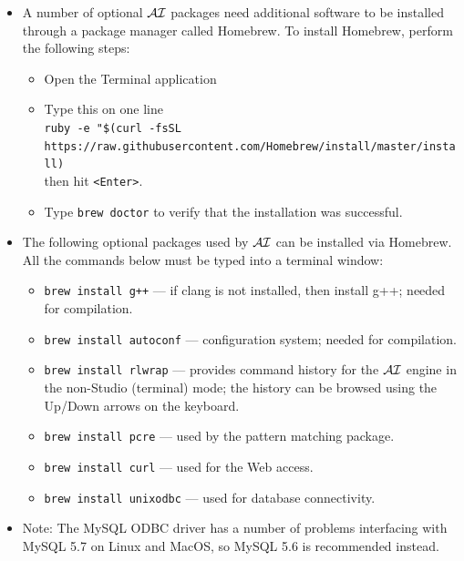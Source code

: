 \documentclass[11pt]{article}
\newcommand{\ERGO}{\mbox{\smaller{\ensuremath{\cal{E}}\smaller{{\sc{RGO}}}}}\xspace}
\newcommand{\ERGOAI}{\mbox{\smaller{\ensuremath{\cal{E}}\smaller{{\sc{RGO}}}}\ensuremath{\cal{AI}}}\xspace}
\begin{document}
\begin{itemize}
\begin{itemize}
\begin{itemize}
\begin{itemize}
      \end{itemize}
    \item A number of optional \ERGOAI packages need additional software to be
      installed through a package manager called Homebrew. To install
      Homebrew, perform the following steps:
      \begin{itemize}
      \item Open the Terminal application
      \item Type this on one line
        \\
        \texttt{ruby -e "\$(curl -fsSL\\
          \hspace*{2mm}
          https://raw.githubusercontent.com/Homebrew/install/master/install)}
        \\
        then hit \texttt{<Enter>}.
      \item Type \texttt{brew doctor} 
        to verify that the installation was successful.
      \end{itemize}
    \item The following optional packages used by \ERGOAI can be installed via
      Homebrew. All the commands below must be typed into a terminal window:
      
    \begin{itemize}
    \item \texttt{brew install g++} --- if clang is not installed, then
      install g++; needed for compilation.
    \item \texttt{brew install autoconf} --- configuration system; needed for
      compilation.
    \item \texttt{brew install rlwrap} --- provides command history for the
      \ERGOAI engine in the non-Studio (terminal) mode; the history can be
      browsed using the Up/Down arrows on the keyboard.
    \item \texttt{brew install pcre} --- used by the \ERGO pattern matching
      package.
    \item \texttt{brew install curl} --- used for the Web access.
    \item \texttt{brew install unixodbc} --- used for database connectivity.
    \end{itemize}
  \item Note: The MySQL ODBC driver has a number of problems interfacing
    with MySQL 5.7 on Linux and MacOS, so MySQL 5.6 is recommended instead.
  \end{itemize}
\end{itemize}
\end{itemize}
\end{document}
